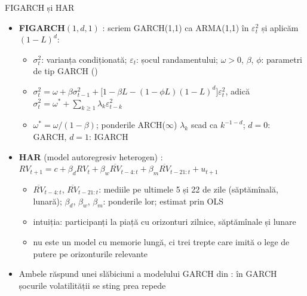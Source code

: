 \begin{frame}{FIGARCH și HAR}
\itemsize{\small}
\begin{itemize}
    \item \textbf{FIGARCH}$(1,d,1)$ : scriem GARCH(1,1) ca ARMA(1,1) în $\varepsilon_t^2$ și aplicăm $(1-L)^d$:
    \begin{itemize}
        \item $\sigma_t^2$: varianța condiționată; $\varepsilon_t$: șocul randamentului; $\omega > 0$, $\beta$, $\phi$: parametri de tip GARCH ()
        \item $\sigma_t^2 = \omega + \beta\sigma_{t-1}^2 + \bigl[1 - \beta L - (1 - \phi L)(1-L)^d\bigr]\varepsilon_t^2$, adică $\sigma_t^2 = \omega^* + \sum_{k\ge1}\lambda_k\varepsilon_{t-k}^2$
        \item $\omega^* = \omega/(1 - \beta)$; ponderile ARCH($\infty$) $\lambda_k$ scad ca $k^{-1-d}$; $d = 0$: GARCH, $d = 1$: IGARCH
    \end{itemize}
    \item \textbf{HAR} (model autoregresiv heterogen) : $RV_{t+1} = c + \beta_d RV_t + \beta_w \overline{RV}_{t-4:t} + \beta_m \overline{RV}_{t-21:t} + u_{t+1}$
    \begin{itemize}
        \item $\overline{RV}_{t-4:t}$, $\overline{RV}_{t-21:t}$: mediile pe ultimele 5 și 22 de zile (săptămînală, lunară); $\beta_d$, $\beta_w$, $\beta_m$: ponderile lor; estimat prin OLS
        \item intuiția: participanți la piață cu orizonturi zilnice, săptămînale și lunare
        \item nu este un model cu memorie lungă, ci trei trepte care imită o lege de putere pe orizonturile relevante
    \end{itemize}
    \item Ambele răspund unei slăbiciuni a modelului GARCH din : în GARCH șocurile volatilității se sting prea repede
\end{itemize}
\end{frame}

